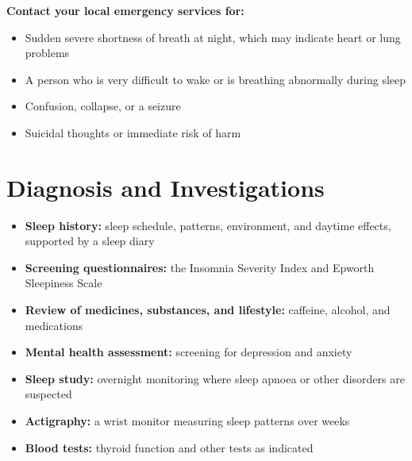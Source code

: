 \textbf{Contact your local emergency services for:}
\begin{itemize}
    \item Sudden severe shortness of breath at night, which may indicate heart or lung problems
    \item A person who is very difficult to wake or is breathing abnormally during sleep
    \item Confusion, collapse, or a seizure
    \item Suicidal thoughts or immediate risk of harm
\end{itemize}

\section*{Diagnosis and Investigations}
\begin{itemize}
    \item \textbf{Sleep history:} sleep schedule, patterns, environment, and daytime effects, supported by a sleep diary
    \item \textbf{Screening questionnaires:} the Insomnia Severity Index and Epworth Sleepiness Scale
    \item \textbf{Review of medicines, substances, and lifestyle:} caffeine, alcohol, and medications
    \item \textbf{Mental health assessment:} screening for depression and anxiety
    \item \textbf{Sleep study:} overnight monitoring where sleep apnoea or other disorders are suspected
    \item \textbf{Actigraphy:} a wrist monitor measuring sleep patterns over weeks
    \item \textbf{Blood tests:} thyroid function and other tests as indicated
\end{itemize}

